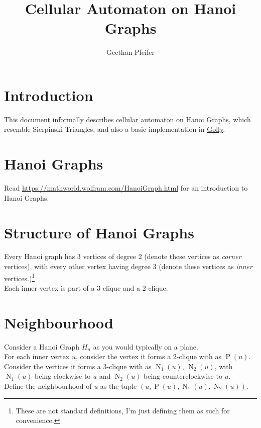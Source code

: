 \documentclass[12pt]{article}
\title{Cellular Automaton on Hanoi Graphs}
\author{Geethan Pfeifer}
\begin{document}
	
	\maketitle
	
	\section{Introduction}
	This document informally describes cellular automaton on Hanoi Graphs, which resemble Sierpinski Triangles, and also a basic implementation in \href{https://golly.sourceforge.io/}{Golly}.
	\section{Hanoi Graphs}
	Read \url{https://mathworld.wolfram.com/HanoiGraph.html} for an introduction to Hanoi Graphs.
	\section{Structure of Hanoi Graphs}
	Every Hanoi graph has 3 vertices of degree 2 (denote these vertices as \textit{corner} vertices), with every other vertex having degree 3 (denote these vertices as \textit{inner} vertices.)\footnote{These are not standard definitions, I'm just defining them as such for convenience.}\\
	Each inner vertex is part of a 3-clique and a 2-clique.
	\section{Neighbourhood}\label{nei}
	Consider a Hanoi Graph $H_n$ as you would typically on a plane.\\
	For each inner vertex $u$, consider the vertex it forms a 2-clique with as $\operatorname{P}(u)$. Consider the vertices it forms a 3-clique with as $\operatorname{N}_1(u)$, $\operatorname{N}_2(u)$, with $\operatorname{N}_1(u)$ being clockwise to $u$ and $\operatorname{N}_2(u)$ being counterclockwise to $u$.\\
	Define the neighbourhood of $u$ as the tuple $(u, \operatorname{P}(u), \operatorname{N}_1(u),\operatorname{N}_2(u))$. 
	\pagebreak
\end{document}
